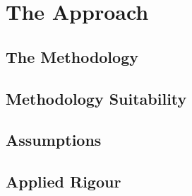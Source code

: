 \section{The Approach}

\subsection{The Methodology}


\subsection{Methodology Suitability}

\subsection{Assumptions}

\subsection{Applied Rigour}